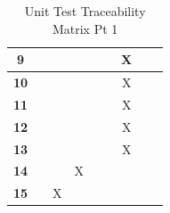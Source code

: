 \documentclass[12pt, titlepage]{article}
\begin{document}
\begin{table} [H]
\begin{tabular}{|c|c|c|c|c|c|c|c|c|}
    \textbf{9}  &                     &                     &                     &                     &                       &  X                     &                      & \\ \hline
    \textbf{10}  &                     &                     &                     &                     &                       &  X                     &                      & \\ \hline
    \textbf{11}  &                     &                     &                     &                     &                       &  X                     &                      & \\ \hline
    \textbf{12}  &                    &                    &                    &                   &                       &     X                  &                       & \\ \hline
    \textbf{13}  &                     &                     &                     &                     &                       &  X                     &                       &                     \\ \hline
    \textbf{14}  &                     &                     & X                    &                     &                       &                       &                       & \\ \hline
    \textbf{15} &                     &  X                   &                     &                     &                   &                  &                       & \\ \hline
  \end{tabular}
  \caption{Unit Test Traceability Matrix Pt 1}
  \label{Table:A_Mod_trace}
\end{table}
\end{document}
